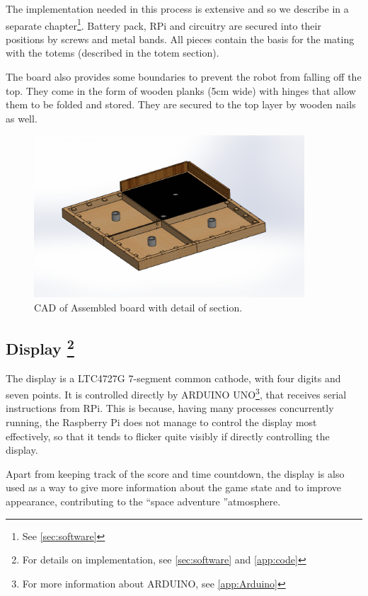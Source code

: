 \documentclass[a4paper,twoside]{book}
\begin{document}
The implementation needed in this process is extensive and so we describe in a separate chapter\footnote{ See \autoref{sec:software}}.
Battery pack, RPi and circuitry are secured into their positions by screws and metal bands. All pieces contain the basis for the mating with the totems (described in the totem section).

The board also provides some boundaries to prevent the robot from falling off the top. They come in the form of wooden planks (5cm wide) with hinges that allow them to be folded and stored. They are secured to the top layer by wooden nails as well.

\begin{figure}[h]
\centering
\includegraphics[width=0.9\textwidth]{img/Board.eps}
\caption{CAD of Assembled board with detail of section.}
\end{figure}

\subsection[Display]{Display \footnote{For details on implementation, see \autoref{sec:software} and \autoref{app:code}}}

The display is a LTC4727G 7-segment common cathode, with four digits and seven points. It is controlled directly by ARDUINO UNO\footnote{For more information about ARDUINO, see \autoref{app:Arduino}}, that receives serial instructions from RPi. This is because, having many processes concurrently running, the Raspberry Pi does not manage to control the display most effectively, so that it tends to flicker quite visibly if directly controlling the display.

Apart from keeping track of the score and time countdown, the display is also used as a way to give more information about the game state and to improve appearance, contributing to the \textquotedblleft space adventure \textquotedblright atmosphere.
\end{document}
